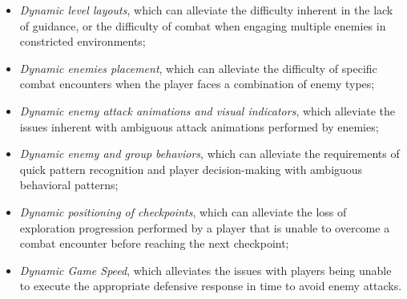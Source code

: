 \begin{itemize}
    \item {\emph{Dynamic level layouts}, which can alleviate the difficulty inherent in the lack of guidance, or the difficulty of combat when engaging multiple enemies in constricted environments;}
    \item {\emph{Dynamic enemies placement}, which can alleviate the difficulty of specific combat encounters when the player faces a combination of enemy types;}
    \item {\emph{Dynamic enemy attack animations and visual indicators}, which alleviate the issues inherent with ambiguous attack animations performed by enemies;}
    \item {\emph{Dynamic enemy and group behaviors}, which can alleviate the requirements of quick pattern recognition and player decision-making with ambiguous behavioral patterns;}
    \item {\emph{Dynamic positioning of checkpoints}, which can alleviate the loss of exploration progression performed by a player that is unable to overcome a combat encounter before reaching the next checkpoint;}
    \item {\emph{Dynamic Game Speed}, which alleviates the issues with players being unable to execute the appropriate defensive response in time to avoid enemy attacks.}
\end{itemize}